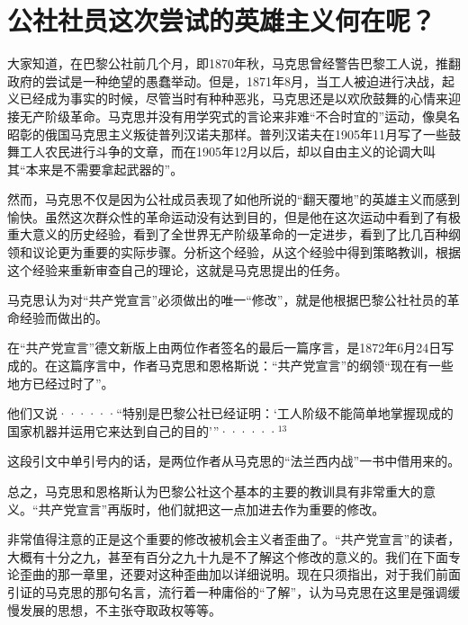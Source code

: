 \chapter{公社社员这次尝试的英雄主义何在呢？} %

大家知道，在巴黎公社前几个月，即1870年秋，马克思曾经警告巴黎工人说，推翻政府的尝试是一种绝望的愚蠢举动。但是，1871年8月，当工人{\kaishu 被迫}进行决战，起义已经成为事实的时候，尽管当时有种种恶兆，马克思还是以欢欣鼓舞的心情来迎接无产阶级革命。马克思并没有用学究式的言论来非难“不合时宜的”运动，像臭名昭彰的俄国马克思主义叛徒普列汉诺夫那样。普列汉诺夫在1905年11月写了一些鼓舞工人农民进行斗争的文章，而在1905年12月以后，却以自由主义的论调大叫其“本来是不需要拿起武器的”。

然而，马克思不仅是因为公社成员表现了如他所说的“翻天覆地”的英雄主义而感到愉快。虽然这次群众性的革命运动没有达到目的，但是他在这次运动中看到了有极重大意义的历史经验，看到了全世界无产阶级革命的一定进步，看到了比几百种纲领和议论更为重要的实际步骤。分析这个经验，从这个经验中得到策略教训，根据这个经验来重新审查自己的理论，这就是马克思提出的任务。

马克思认为对“共产党宣言”必须做出的唯一“修改”，就是他根据巴黎公社社员的革命经验而做出的。

在“共产党宣言”德文新版上由两位作者签名的最后一篇序言，是1872年6月24日写成的。在这篇序言中，作者马克思和恩格斯说：“共产党宣言”的纲领“现在有一些地方已经过时了”。

\pskip 
\leftskip=10mm
\small

他们又说······“特别是巴黎公社已经证明：‘工人阶级不能简单地掌握现成的国家机器并运用它来达到自己的目的’”······$^{13}$

\leftskip=0mm
\normalsize
\pskip 

这段引文中单引号内的话，是两位作者从马克思的“法兰西内战”一书中借用来的。

总之，马克思和恩格斯认为巴黎公社这个基本的主要的教训具有非常重大的意义。“共产党宣言”再版时，他们就把这一点加进去作为重要的修改。

非常值得注意的正是这个重要的修改被机会主义者歪曲了。“共产党宣言”的读者，大概有十分之九，甚至有百分之九十九是不了解这个修改的意义的。我们在下面专论歪曲的那一章里，还要对这种歪曲加以详细说明。现在只须指出，对于我们前面引证的马克思的那句名言，流行着一种庸俗的“了解”，认为马克思在这里是强调缓慢发展的思想，不主张夺取政权等等。

